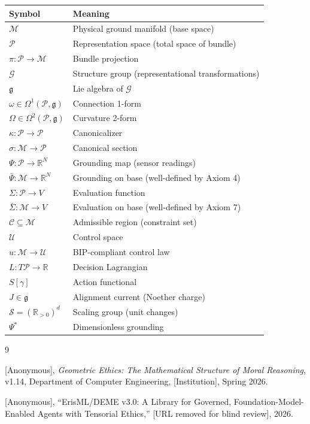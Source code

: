 \documentclass[11pt]{article}
\begin{document}
\begin{table}[h]
\centering
\begin{tabular}{@{}ll@{}}
\toprule
\textbf{Symbol} & \textbf{Meaning} \\
\midrule
$\mathcal{M}$ & Physical ground manifold (base space) \\
$\mathcal{P}$ & Representation space (total space of bundle) \\
$\pi : \mathcal{P} \to \mathcal{M}$ & Bundle projection \\
$\mathcal{G}$ & Structure group (representational transformations) \\
$\mathfrak{g}$ & Lie algebra of $\mathcal{G}$ \\
$\omega \in \Omega^1(\mathcal{P}, \mathfrak{g})$ & Connection 1-form \\
$\Omega \in \Omega^2(\mathcal{P}, \mathfrak{g})$ & Curvature 2-form \\
$\kappa : \mathcal{P} \to \mathcal{P}$ & Canonicalizer \\
$\sigma : \mathcal{M} \to \mathcal{P}$ & Canonical section \\
$\Psi : \mathcal{P} \to \mathbb{R}^N$ & Grounding map (sensor readings) \\
$\bar{\Psi} : \mathcal{M} \to \mathbb{R}^N$ & Grounding on base (well-defined by Axiom 4) \\
$\Sigma : \mathcal{P} \to V$ & Evaluation function \\
$\bar{\Sigma} : \mathcal{M} \to V$ & Evaluation on base (well-defined by Axiom 7) \\
$\mathcal{C} \subseteq \mathcal{M}$ & Admissible region (constraint set) \\
$\mathcal{U}$ & Control space \\
$u : \mathcal{M} \to \mathcal{U}$ & BIP-compliant control law \\
$L : T\mathcal{P} \to \mathbb{R}$ & Decision Lagrangian \\
$S[\gamma]$ & Action functional \\
$J \in \mathfrak{g}$ & Alignment current (Noether charge) \\
$\mathcal{S} = (\mathbb{R}_{>0})^d$ & Scaling group (unit changes) \\
$\Psi^*$ & Dimensionless grounding \\
\bottomrule
\end{tabular}
\end{table}

\begin{thebibliography}{9}

[Anonymous], \emph{Geometric Ethics: The Mathematical Structure of Moral Reasoning}, v1.14, Department of Computer Engineering, [Institution], Spring 2026.

[Anonymous], ``ErisML/DEME v3.0: A Library for Governed, Foundation-Model-Enabled Agents with Tensorial Ethics,'' [URL removed for blind review], 2026.

\end{thebibliography}
\end{document}
